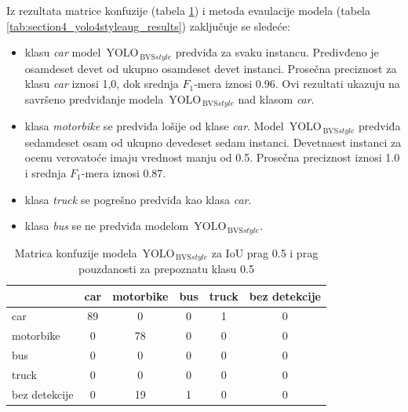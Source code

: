\documentclass[12pt,oneside]{memoir}
\newcommand{\yolo}{\ensuremath{\,\textrm{YOLO}}}
\newcommand{\bvs}{\ensuremath{\,\textrm{BVS}}}
\begin{document}
Iz rezultata matrice konfuzije (tabela \ref{tab:section4_yolo4styleaug_confusionmatrix}) i metoda evaulacije modela (tabela \ref{tab:section4_yolo4styleaug_results}) zaključuje se sledeće:
\begin{itemize}
    \item klasu \textit{car} model $\yolo_{\bvs{style}}$ predviđa za svaku instancu. Predivđeno je osamdeset devet od ukupno osamdeset devet instanci. Prosečna preciznost za klasu \textit{car} iznosi 1,0, dok srednja $F_1$-mera iznosi 0.96. Ovi rezultati ukazuju na savršeno predviđanje modela $\yolo_{\bvs{style}}$ nad klasom \textit{car}.
    \item klasa \textit{motorbike} se predviđa lošije od klase \textit{car}. Model $\yolo_{\bvs{style}}$ predviđa sedamdeset osam od ukupno devedeset sedam instanci. Devetnaest instanci za ocenu verovatoće imaju vrednost manju od 0.5. Prosečna preciznost iznosi 1.0 i srednja $F_1$-mera iznosi 0.87.
    \item klasa \textit{truck} se pogrešno predviđa kao klasa \textit{car}. 
    \item klasa \textit{bus} se ne predviđa modelom $\yolo_{\bvs{style}}$.
\end{itemize}


\begin{table}
    \begin{center}
    \caption{Matrica konfuzije modela $\yolo_{\bvs{style}}$ za IoU prag 0.5 i prag pouzdanosti za prepoznatu klasu 0.5 }
    \begin{tabular}{ l|c|c|c|c|c|}
                  & car  & motorbike & bus & truck & bez detekcije \\ \hline
    car           & 89   & 0         & 0   & 1     & 0             \\ 
    motorbike     & 0    & 78        & 0   & 0     & 0             \\ 
    bus           & 0    & 0         & 0   & 0     & 0             \\ 
    truck         & 0    & 0         & 0   & 0     & 0             \\ 
    bez detekcije & 0    & 19        & 1   & 0     & 0             \\ \hline
    \hline
    \end{tabular}
    \label{tab:section4_yolo4styleaug_confusionmatrix}
    \end{center}
\end{table}
\end{document}

